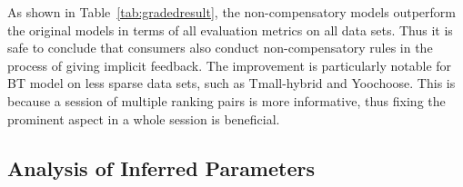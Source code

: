 \documentclass[letterpaper]{article} %
\begin{document}
As shown in Table~\ref{tab:gradedresult}, the non-compensatory models outperform the original models in terms of all evaluation metrics on all data sets. Thus it is safe to conclude that consumers also conduct non-compensatory rules in the process of giving implicit feedback. The improvement is particularly notable for BT model on less sparse data sets, such as Tmall-hybrid and Yoochoose. This is because a session of multiple ranking pairs is more informative, thus fixing the prominent aspect in a whole session is beneficial. %

\subsection{Analysis of Inferred Parameters}
\end{document}
